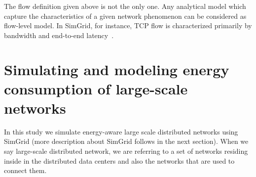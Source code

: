 The flow definition given above is not the only one. Any analytical model which capture the characteristics of a given network phenomenon can be considered as flow-level model. In SimGrid, for instance, TCP flow is characterized primarily by bandwidth and end-to-end latency~\cite{DBLP:journals/jpdc/CasanovaGLQS14}.

\section{Simulating and modeling energy consumption of large-scale networks}

In this study we simulate energy-aware large scale distributed networks using SimGrid (more description about SimGrid follows in the next section). When we say large-scale distributed network, we are referring to a set of networks residing inside in the distributed data centers and also the networks that are used to connect them. 

